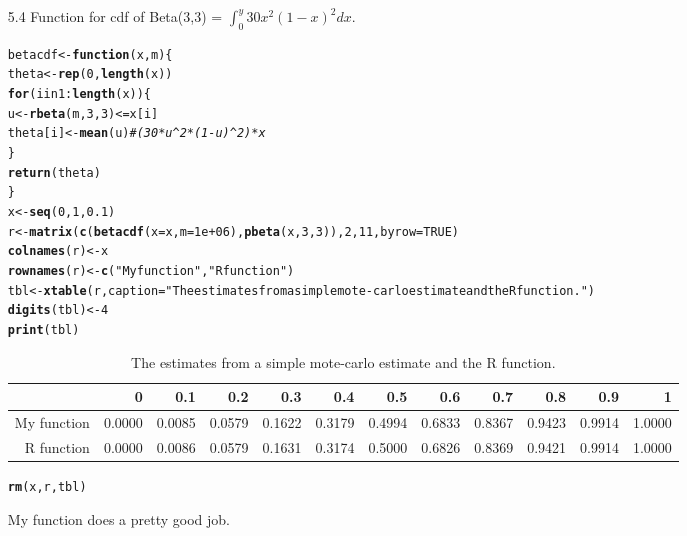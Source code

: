 \documentclass{article}\usepackage[]{graphicx}\usepackage[]{color}
\makeatletter
\newcommand{\hlstr}[1]{\textcolor[rgb]{0.192,0.494,0.8}{#1}}%
\newcommand{\hlcom}[1]{\textcolor[rgb]{0.678,0.584,0.686}{\textit{#1}}}%
\newcommand{\hlkwd}[1]{\textcolor[rgb]{0.737,0.353,0.396}{\textbf{#1}}}%
\newenvironment{kframe}{%
 \def\at@end@of@kframe{}%
 \ifinner\ifhmode%
  \def\at@end@of@kframe{\end{minipage}}%
  \begin{minipage}{\columnwidth}%
 \fi\fi%
 \def\FrameCommand##1{\hskip\@totalleftmargin \hskip-\fboxsep
 \colorbox{shadecolor}{##1}\hskip-\fboxsep
     \hskip-\linewidth \hskip-\@totalleftmargin \hskip\columnwidth}%
 \MakeFramed {\advance\hsize-\width
   \@totalleftmargin\z@ \linewidth\hsize
   \@setminipage}}%
 {\par\unskip\endMakeFramed%
 \at@end@of@kframe}
\makeatother
\begin{document}
\begin{itemize}
\item[5.4]  Function for cdf of Beta(3,3) = $\int_0^y 30x^2(1-x)^2dx$.\\
\begin{kframe}
\begin{alltt}
betacdf <- \hlkwd{function}(x, m) \{
    theta <- \hlkwd{rep}(0, \hlkwd{length}(x))
    \hlkwd{for} (i in 1:\hlkwd{length}(x)) \{
        u <- \hlkwd{rbeta}(m, 3, 3) <= x[i]
        theta[i] <- \hlkwd{mean}(u)  \hlcom{#(30*u^2*(1-u)^2)*x}
    \}
    \hlkwd{return}(theta)
\}
x <- \hlkwd{seq}(0, 1, 0.1)
r <- \hlkwd{matrix}(\hlkwd{c}(\hlkwd{betacdf}(x = x, m = 1e+06), \hlkwd{pbeta}(x, 3, 3)), 2, 11, byrow = TRUE)
\hlkwd{colnames}(r) <- x
\hlkwd{rownames}(r) <- \hlkwd{c}(\hlstr{"My function"}, \hlstr{"R function"})
tbl <- \hlkwd{xtable}(r, caption = \hlstr{"The estimates from a simple mote-carlo estimate and the R function."})
\hlkwd{digits}(tbl) <- 4
\hlkwd{print}(tbl)
\end{alltt}
\end{kframe}%
\begin{table}[ht]
\centering
\begin{tabular}{rrrrrrrrrrrr}
  \hline
 & 0 & 0.1 & 0.2 & 0.3 & 0.4 & 0.5 & 0.6 & 0.7 & 0.8 & 0.9 & 1 \\ 
  \hline
My function & 0.0000 & 0.0085 & 0.0579 & 0.1622 & 0.3179 & 0.4994 & 0.6833 & 0.8367 & 0.9423 & 0.9914 & 1.0000 \\ 
  R function & 0.0000 & 0.0086 & 0.0579 & 0.1631 & 0.3174 & 0.5000 & 0.6826 & 0.8369 & 0.9421 & 0.9914 & 1.0000 \\ 
   \hline
\end{tabular}
\caption{The estimates from a simple mote-carlo estimate and the R function.} 
\end{table}
\begin{kframe}\begin{alltt}
\hlkwd{rm}(x, r, tbl)
\end{alltt}
\end{kframe}

My function does a pretty good job.\\


\end{itemize}
\end{document}
